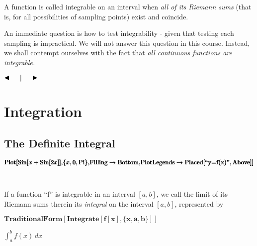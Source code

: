 \documentclass{article}
\begin{document}
A function is called integrable on an interval when \textit{ all of its Riemann sums }(that is, for all possibilities of sampling points) exist and
coincide. 

An immediate question is how to test integrability - given that testing each sampling is impractical. We will not answer this question in this course.
Instead, we shall contempt ourselves with the fact that \textit{ all continuous functions are integrable.}\textit{  }

$\blacktriangleleft \thickspace \thickspace \thickspace $$\thickspace \thickspace |\thickspace \thickspace $$\thickspace \thickspace \thickspace
\blacktriangleright $



\section*{Integration}

\subsection*{The Definite Integral}

\begin{doublespace}
\noindent\(\pmb{\text{Plot}[\text{Sin}[x+\text{Sin}[2x]],}\\
\pmb{ \{x,0,\text{Pi}\},}\\
\pmb{ \text{Filling}\to \text{Bottom},}\\
\pmb{\text{PlotLegends}\to \text{Placed}[\text{{``}y=f(x){''}},\text{Above}] ]}\)
\end{doublespace}

\begin{doublespace}
\noindent\(\begin{array}{c}
  \\
  \\
\end{array}\)
\end{doublespace}

If a function {``}f{''} is integrable in an interval \([a,b]\), we call the limit of its Riemann sums therein its \textit{ integral} on the interval
\([a,b]\), represented by 

\begin{doublespace}
\noindent\(\pmb{\text{TraditionalForm}[\text{Integrate}[f[x],\{x,a,b\}]]}\)
\end{doublespace}

\begin{doublespace}
\noindent\(\int_a^b f(x) \, dx\)
\end{doublespace}
\end{document}
